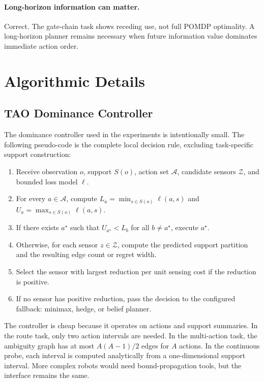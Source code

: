 \documentclass{article}
\newcommand{\actions}{\mathcal{A}}
\newcommand{\loss}{\ell}
\newcommand{\sensors}{\mathcal{Z}}
\begin{document}
\paragraph{Long-horizon information can matter.}
Correct. The gate-chain task shows receding use, not full POMDP optimality. A long-horizon planner remains necessary when future information value dominates immediate action order.

\section{Algorithmic Details}

\subsection{TAO Dominance Controller}

The dominance controller used in the experiments is intentionally small. The following pseudo-code is the complete local decision rule, excluding task-specific support construction:
\begin{enumerate}
  \item Receive observation $o$, support $S(o)$, action set $\actions$, candidate sensors $\sensors$, and bounded loss model $\loss$.
  \item For every $a\in\actions$, compute $L_a=\min_{s\in S(o)}\loss(a,s)$ and $U_a=\max_{s\in S(o)}\loss(a,s)$.
  \item If there exists $a^\star$ such that $U_{a^\star}<L_b$ for all $b\neq a^\star$, execute $a^\star$.
  \item Otherwise, for each sensor $z\in\sensors$, compute the predicted support partition and the resulting edge count or regret width.
  \item Select the sensor with largest reduction per unit sensing cost if the reduction is positive.
  \item If no sensor has positive reduction, pass the decision to the configured fallback: minimax, hedge, or belief planner.
\end{enumerate}
The controller is cheap because it operates on actions and support summaries. In the route task, only two action intervals are needed. In the multi-action task, the ambiguity graph has at most $A(A-1)/2$ edges for $A$ actions. In the continuous probe, each interval is computed analytically from a one-dimensional support interval. More complex robots would need bound-propagation tools, but the interface remains the same.
\end{document}
